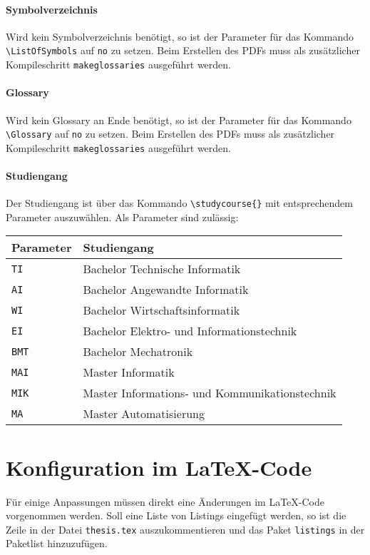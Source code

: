 \paragraph{Symbolverzeichnis} Wird kein Symbolverzeichnis benötigt, so ist der Parameter für das Kommando \texttt{\textbackslash ListOfSymbols} auf \texttt{no} zu setzen. Beim Erstellen des PDFs muss als zusätzlicher Kompileschritt \texttt{makeglossaries} ausgeführt werden.

\paragraph{Glossary} Wird kein Glossary an Ende benötigt, so ist der Parameter für das Kommando \texttt{\textbackslash Glossary} auf \texttt{no} zu setzen. Beim Erstellen des PDFs muss als zusätzlicher Kompileschritt \texttt{makeglossaries} ausgeführt werden.

\paragraph{Studiengang} Der Studiengang ist über das Kommando
\texttt{\textbackslash studycourse\{\}} mit entsprechendem Parameter
auszuwählen. Als Parameter sind zulässig:

\begin{center}
  \begin {tabular}{ll}
    Parameter & Studiengang \\
    \hline
    \texttt{TI} & Bachelor Technische Informatik \\
    \texttt{AI} & Bachelor Angewandte Informatik \\
    \texttt{WI} & Bachelor Wirtschaftsinformatik \\
    \texttt{EI} & Bachelor Elektro- und Informationstechnik \\
    \texttt{BMT} & Bachelor Mechatronik \\
    \texttt{MAI} & Master Informatik \\
    \texttt{MIK} & Master Informations- und Kommunikationstechnik \\
    \texttt{MA} & Master Automatisierung \\
  \end{tabular}
\end{center}

\section{Konfiguration im \LaTeX -Code}\label{sec:codechanges}
Für einige Anpassungen müssen direkt eine Änderungen im \LaTeX -Code vorgenommen werden. Soll eine Liste von Listings eingefügt werden, so ist die Zeile in der Datei \texttt{thesis.tex} auszukommentieren und das Paket \texttt{listings} in der Paketlist hinzuzufügen.
